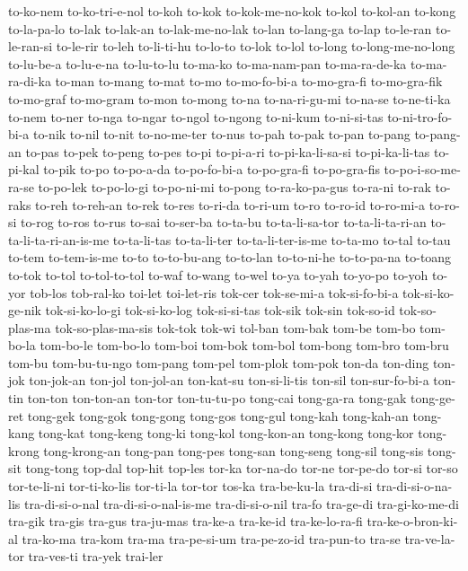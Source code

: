 {to-ko-nem to-ko-tri-e-nol to-koh to-kok to-kok-me-no-kok to-kol to-kol-an
to-kong to-la-pa-lo to-lak to-lak-an to-lak-me-no-lak to-lan to-lang-ga
to-lap to-le-ran to-le-ran-si to-le-rir to-leh to-li-ti-hu to-lo-to to-lok
to-lol to-long to-long-me-no-long to-lu-be-a to-lu-e-na to-lu-to-lu
to-ma-ko to-ma-nam-pan to-ma-ra-de-ka to-ma-ra-di-ka to-man to-mang to-mat
to-mo to-mo-fo-bi-a to-mo-gra-fi to-mo-gra-fik to-mo-graf to-mo-gram
to-mon to-mong to-na to-na-ri-gu-mi to-na-se to-ne-ti-ka to-nem to-ner
to-nga to-ngar to-ngol to-ngong to-ni-kum to-ni-si-tas to-ni-tro-fo-bi-a
to-nik to-nil to-nit to-no-me-ter to-nus to-pah to-pak to-pan to-pang
to-pang-an to-pas to-pek to-peng to-pes to-pi to-pi-a-ri to-pi-ka-li-sa-si
to-pi-ka-li-tas to-pi-kal to-pik to-po to-po-a-da to-po-fo-bi-a
to-po-gra-fi to-po-gra-fis to-po-i-so-me-ra-se to-po-lek to-po-lo-gi
to-po-ni-mi to-pong to-ra-ko-pa-gus to-ra-ni to-rak to-raks to-reh
to-reh-an to-rek to-res to-ri-da to-ri-um to-ro to-ro-id to-ro-mi-a
to-ro-si to-rog to-ros to-rus to-sai to-ser-ba to-ta-bu to-ta-li-sa-tor
to-ta-li-ta-ri-an to-ta-li-ta-ri-an-is-me to-ta-li-tas to-ta-li-ter
to-ta-li-ter-is-me to-ta-mo to-tal to-tau to-tem to-tem-is-me to-to
to-to-bu-ang to-to-lan to-to-ni-he to-to-pa-na to-toang to-tok to-tol
to-tol-to-tol to-waf to-wang to-wel to-ya to-yah to-yo-po to-yoh to-yor
tob-los tob-ral-ko toi-let toi-let-ris tok-cer tok-se-mi-a tok-si-fo-bi-a
tok-si-ko-ge-nik tok-si-ko-lo-gi tok-si-ko-log tok-si-si-tas tok-sik
tok-sin tok-so-id tok-so-plas-ma tok-so-plas-ma-sis tok-tok tok-wi tol-ban
tom-bak tom-be tom-bo tom-bo-la tom-bo-le tom-bo-lo tom-boi tom-bok
tom-bol tom-bong tom-bro tom-bru tom-bu tom-bu-tu-ngo tom-pang tom-pel
tom-plok tom-pok ton-da ton-ding ton-jok ton-jok-an ton-jol ton-jol-an
ton-kat-su ton-si-li-tis ton-sil ton-sur-fo-bi-a ton-tin ton-ton
ton-ton-an ton-tor ton-tu-tu-po tong-cai tong-ga-ra tong-gak tong-ge-ret
tong-gek tong-gok tong-gong tong-gos tong-gul tong-kah tong-kah-an
tong-kang tong-kat tong-keng tong-ki tong-kol tong-kon-an tong-kong
tong-kor tong-krong tong-krong-an tong-pan tong-pes tong-san tong-seng
tong-sil tong-sis tong-sit tong-tong top-dal top-hit top-les tor-ka
tor-na-do tor-ne tor-pe-do tor-si tor-so tor-te-li-ni tor-ti-ko-lis
tor-ti-la tor-tor tos-ka tra-be-ku-la tra-di-si tra-di-si-o-na-lis
tra-di-si-o-nal tra-di-si-o-nal-is-me tra-di-si-o-nil tra-fo tra-ge-di
tra-gi-ko-me-di tra-gik tra-gis tra-gus tra-ju-mas tra-ke-a tra-ke-id
tra-ke-lo-ra-fi tra-ke-o-bron-ki-al tra-ko-ma tra-kom tra-ma tra-pe-si-um
tra-pe-zo-id tra-pun-to tra-se tra-ve-la-tor tra-ves-ti tra-yek trai-ler
}
